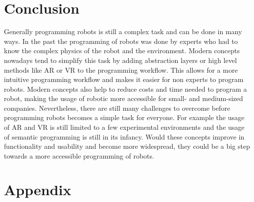 \documentclass[conference]{IEEEtran}
\begin{document}
\section{Conclusion}

    Generally programming robots is still a complex task and can be done in many ways. 
    In the past the programming of robots was done by experts who had to know the complex physics of the robot and the environment. Modern concepts nowadays tend to simplify this task by adding abstraction layers or high level methods like AR or VR to the programming workflow. This allows for a more intuitive programming workflow and makes it easier for non experts to program robots. Modern concepts also help to reduce costs and time needed to program a robot, making the usage of robotic more accessible for small- and medium-sized companies.
    Nevertheless, there are still many challenges to overcome before programming robots becomes a simple task for everyone. For example the usage of AR and VR is still limited to a few experimental environments and the usage of semantic programming is still in its infancy. Would these concepts improve in functionality and usability and become more widespread, they could be a big step towards a more accessible programming of robots.

\nocite{*}





\cleardoublepage
\appendix

\section{Appendix}
\end{document}

